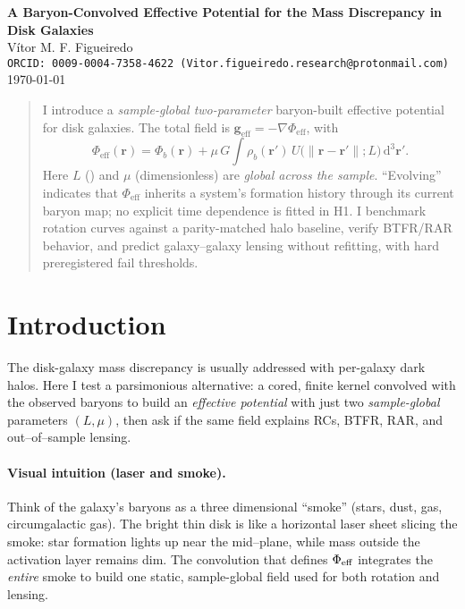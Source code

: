 \documentclass[11pt,a4paper]{article}
\newcommand{\dd}{\mathrm{d}}
\newcommand{\vect}[1]{\bm{#1}}
\newcommand{\Lmem}{L}       %
\newcommand{\gain}{\mu}     %
\newcommand{\rhob}{\rho_b}  %
\newcommand{\phieff}{\Phi_{\mathrm{eff}}}
\newcommand{\geff}{\vect{g}_{\mathrm{eff}}}
\begin{document}
\begin{center}
{\LARGE \textbf{A Baryon-Convolved Effective Potential for the Mass Discrepancy in Disk Galaxies}}\\[0.6em]
{\large Vítor M. F. Figueiredo}\\
\texttt{ORCID: 0009-0004-7358-4622 \quad (Vitor.figueiredo.research@protonmail.com)}\\[0.5em]
\today
\end{center}

\begin{abstract}
I introduce a \emph{sample-global two-parameter} baryon-built effective potential for disk galaxies. The total field is $\geff=-\nabla\phieff$, with
\[
\phieff(\vect{r})=\Phi_b(\vect{r})
+\gain\,G\!\int \rhob(\vect{r}')\,U\!\big(\lVert\vect{r}-\vect{r}'\rVert;\Lmem\big)\,\dd^3\vect{r}'.
\]
Here $\Lmem$ (\si{\kpc}) and $\gain$ (dimensionless) are \emph{global across the sample}. “Evolving” indicates that $\phieff$ inherits a system’s formation history through its current baryon map; no explicit time dependence is fitted in H1. I benchmark rotation curves against a parity-matched halo baseline, verify BTFR/RAR behavior, and predict galaxy–galaxy lensing without refitting, with hard preregistered fail thresholds.
\end{abstract}

\section{Introduction}\label{sec:intro}
The disk-galaxy mass discrepancy is usually addressed with per-galaxy dark halos. Here I test a parsimonious alternative: a cored, finite kernel convolved with the observed baryons to build an \emph{effective potential} with just two \emph{sample-global} parameters $(\Lmem,\gain)$, then ask if the same field explains RCs, BTFR, RAR, and out–of–sample lensing.

\paragraph{Visual intuition (laser and smoke).}
Think of the galaxy’s baryons as a three dimensional “smoke” (stars, dust, gas, circumgalactic gas). The bright thin disk is like a horizontal laser sheet slicing the smoke: star formation lights up near the mid–plane, while mass outside the activation layer remains dim. The convolution that defines $\Phi_{\rm eff}$ integrates the \emph{entire} smoke to build one static, sample-global field used for both rotation and lensing.
\end{document}

